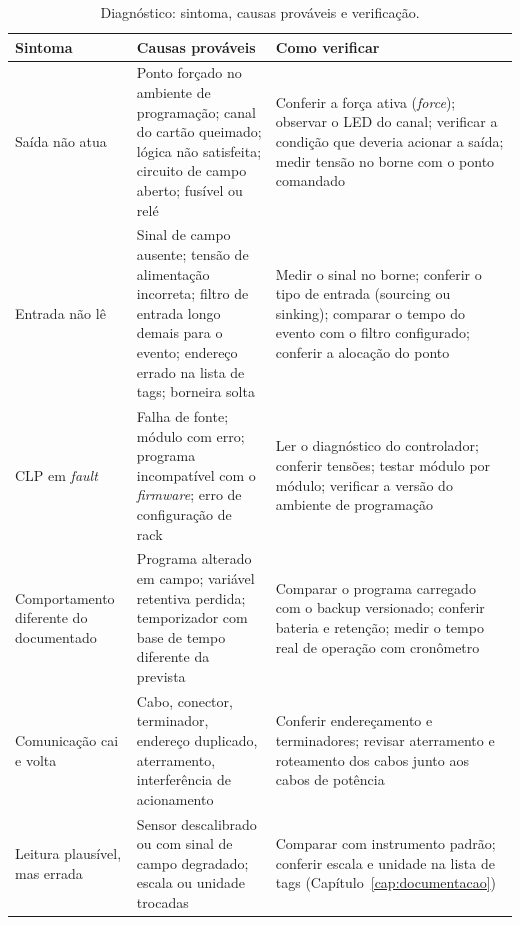 \begin{table}[H]
  \centering
  \caption{Diagnóstico: sintoma, causas prováveis e verificação.}
  \label{tab:diagnostico}
  \begin{tabular}{p{3.3cm} p{5.1cm} p{5.9cm}}
    \toprule
    Sintoma & Causas prováveis & Como verificar \\
    \midrule
    Saída não atua
      & Ponto forçado no ambiente de programação; canal do cartão queimado; lógica não satisfeita;
        circuito de campo aberto; fusível ou relé
      & Conferir a força ativa (\emph{force}); observar o LED do canal; verificar a condição que
        deveria acionar a saída; medir tensão no borne com o ponto comandado \\
    \addlinespace
    Entrada não lê
      & Sinal de campo ausente; tensão de alimentação incorreta; filtro de entrada longo demais para o
        evento; endereço errado na lista de tags; borneira solta
      & Medir o sinal no borne; conferir o tipo de entrada (sourcing ou sinking); comparar o tempo do
        evento com o filtro configurado; conferir a alocação do ponto \\
    \addlinespace
    CLP em \emph{fault}
      & Falha de fonte; módulo com erro; programa incompatível com o \emph{firmware}; erro de
        configuração de rack
      & Ler o diagnóstico do controlador; conferir tensões; testar módulo por módulo; verificar a
        versão do ambiente de programação \\
    \addlinespace
    Comportamento diferente do documentado
      & Programa alterado em campo; variável retentiva perdida; temporizador com base de tempo
        diferente da prevista
      & Comparar o programa carregado com o backup versionado; conferir bateria e retenção; medir o
        tempo real de operação com cronômetro \\
    \addlinespace
    Comunicação cai e volta
      & Cabo, conector, terminador, endereço duplicado, aterramento, interferência de acionamento
      & Conferir endereçamento e terminadores; revisar aterramento e roteamento dos cabos junto aos
        cabos de potência \\
    \addlinespace
    Leitura plausível, mas errada
      & Sensor descalibrado ou com sinal de campo degradado; escala ou unidade trocadas
      & Comparar com instrumento padrão; conferir escala e unidade na lista de tags
        (Capítulo~\ref{cap:documentacao}) \\
    \bottomrule
  \end{tabular}
\end{table}


